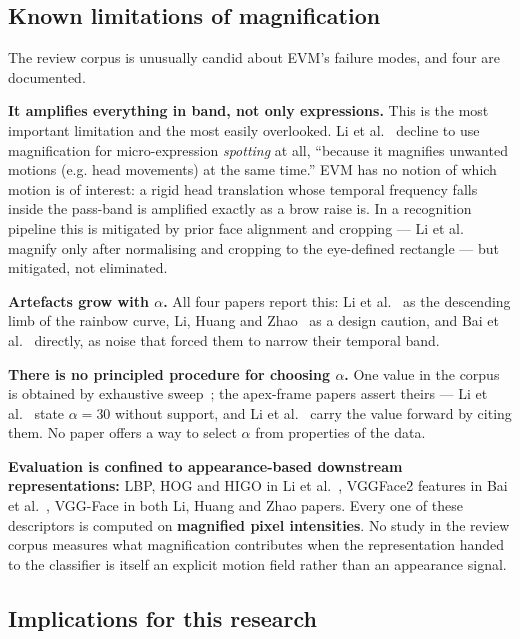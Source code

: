 \subsection{Known limitations of magnification}
\label{sec:evm-limitations}

The review corpus is unusually candid about EVM's failure modes, and four are documented.

\textbf{It amplifies everything in band, not only expressions.} This is the most important limitation and the most easily overlooked. Li et al.~\cite{liX2018} decline to use magnification for micro-expression \textit{spotting} at all, ``because it magnifies unwanted motions (e.g. head movements) at the same time.'' EVM has no notion of which motion is of interest: a rigid head translation whose temporal frequency falls inside the pass-band is amplified exactly as a brow raise is. In a recognition pipeline this is mitigated by prior face alignment and cropping --- Li et al.~\cite{liX2018} magnify only after normalising and cropping to the eye-defined rectangle --- but mitigated, not eliminated.

\textbf{Artefacts grow with $\alpha$.} All four papers report this: Li et al.~\cite{liX2018} as the descending limb of the rainbow curve, Li, Huang and Zhao~\cite{liY2018,liY2021} as a design caution, and Bai et al.~\cite{bai2021} directly, as noise that forced them to narrow their temporal band.

\textbf{There is no principled procedure for choosing $\alpha$.} One value in the corpus is obtained by exhaustive sweep~\cite{liX2018}; the apex-frame papers assert theirs --- Li et al.~\cite{liY2018} state $\alpha = 30$ without support, and Li et al.~\cite{liY2021} carry the value forward by citing them. No paper offers a way to select $\alpha$ from properties of the data.

\textbf{Evaluation is confined to appearance-based downstream representations:} LBP, HOG and HIGO in Li et al.~\cite{liX2018}, VGGFace2 features in Bai et al.~\cite{bai2021}, VGG-Face in both Li, Huang and Zhao papers. Every one of these descriptors is computed on \textbf{magnified pixel intensities}. No study in the review corpus measures what magnification contributes when the representation handed to the classifier is itself an explicit motion field rather than an appearance signal.

\subsection{Implications for this research}
\label{sec:evm-implications}
\label{sec:evm-motion-hypothesis}

